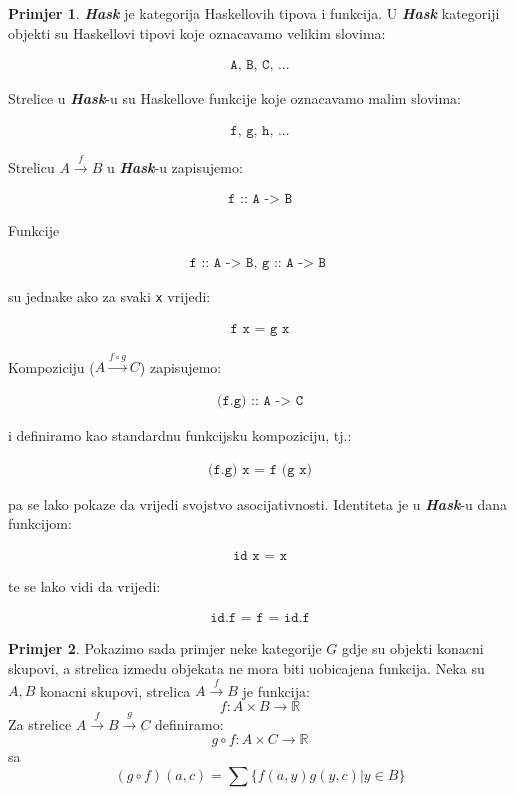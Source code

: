 \documentclass[11pt]{article}
\newcommand{\category}[1]{\textbf{\emph{#1}}}
\newcommand{\code}[1]{
  \begin{align*}
    \texttt{#1}
  \end{align*}
  }
\theoremstyle{definition}
\newtheorem{primjer}{Primjer}
\begin{document}
  \begin{primjer} \category{Hask} je kategorija Haskellovih tipova i funkcija. U
  \category{Hask} kategoriji objekti su Haskellovi tipovi koje oznacavamo velikim
  slovima:
    \code{A, B, C, ...}
  Strelice u \category{Hask}-u su Haskellove funkcije koje oznacavamo malim
  slovima:
    \code{f, g, h, ...}
  Strelicu $A \xrightarrow{f} B$ u \category{Hask}-u zapisujemo:
    \code{f :: A -> B}
  Funkcije
    \code{
      f :: A -> B, g :: A -> B
      }
  su jednake ako za svaki \texttt{x} vrijedi:
    \code{ f x = g x }
  Kompoziciju ($A \xrightarrow{f \circ g} C$) zapisujemo:
    \code{(f.g) :: A -> C}
    i definiramo kao standardnu funkcijsku kompoziciju, tj.:
    \code{(f.g) x = f (g x)}
  pa se lako pokaze da vrijedi svojstvo asocijativnosti.
  Identiteta je u \category{Hask}-u dana funkcijom:
    \code{ id x = x }
  te se lako vidi da vrijedi:
    \code{ id.f = f = id.f }
  \end{primjer}

  \begin{primjer}
    Pokazimo sada primjer neke kategorije $G$ gdje su objekti konacni skupovi,
    a strelica izmedu objekata ne mora biti uobicajena funkcija.
    Neka su $A, B$ konacni skupovi, strelica $A \xrightarrow{f} B$ je funkcija:
    \begin{equation*}
      f:A \times B \rightarrow \mathbb{R}
    \end{equation*}
    Za strelice $A \xrightarrow{f} B \xrightarrow{g} C$ definiramo:
    \begin{equation*}
      g \circ f:A \times C \rightarrow \mathbb{R}
    \end{equation*}
    sa
    \begin{equation*}
      (g \circ f)(a, c) = \sum\{f(a, y)g(y,c) | y \in B\}
    \end{equation*}
  \end{primjer}
\end{document}

